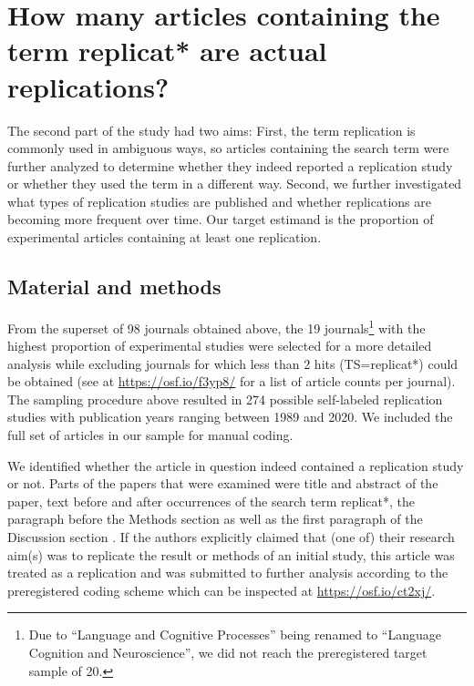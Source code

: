 \documentclass[cm,linguex]{glossa}
\begin{document}
\hypertarget{how-many-articles-containing-the-term-replicat-are-actual-replications}{%
\section{How many articles containing the term replicat* are actual replications?}\label{how-many-articles-containing-the-term-replicat-are-actual-replications}}

The second part of the study had two aims: First, the term replication is commonly used in ambiguous ways, so articles containing the search term were further analyzed to determine whether they indeed reported a replication study or whether they used the term in a different way.
Second, we further investigated what types of replication studies are published and whether replications are becoming more frequent over time. Our target estimand is the proportion of experimental articles containing at least one replication.

\hypertarget{material-and-methods-1}{%
\subsection{Material and methods}\label{material-and-methods-1}}

From the superset of 98 journals obtained above, the 19 journals\footnote{Due to ``Language and Cognitive Processes'' being renamed to ``Language Cognition and Neuroscience'', we did not reach the preregistered target sample of 20.} with the highest proportion of experimental studies were selected for a more detailed analysis while excluding journals for which less than 2 hits (TS=replicat*) could be obtained (see at \url{https://osf.io/f3yp8/} for a list of article counts per journal).
The sampling procedure above resulted in 274 possible self-labeled replication studies with publication years ranging between 1989 and 2020. We included the full set of articles in our sample for manual coding.

We identified whether the article in question indeed contained a replication study or not.
Parts of the papers that were examined were title and abstract of the paper, text before and after occurrences of the search term replicat*, the paragraph before the Methods section as well as the first paragraph of the Discussion section \citep[following and adapting the procedure specified by][]{makel_replication_2016}.
If the authors explicitly claimed that (one of) their research aim(s) was to replicate the result or methods of an initial study, this article was treated as a replication and was submitted to further analysis according to the preregistered coding scheme which can be inspected at \url{https://osf.io/ct2xj/}.
\end{document}
